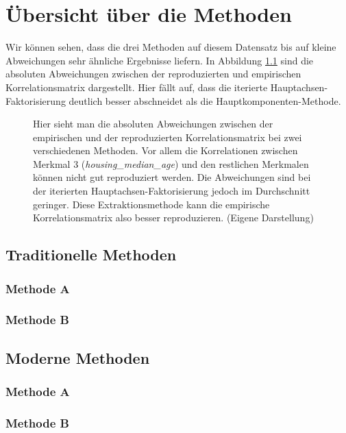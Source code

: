 \chapter{Übersicht über die Methoden}
\label{sec:Übersicht}

Wir können sehen, dass die drei Methoden auf diesem Datensatz bis auf kleine Abweichungen sehr ähnliche Ergebnisse liefern.
In Abbildung \ref{fig:Residualmatrizen} sind die absoluten Abweichungen zwischen der reproduzierten und empirischen Korrelationsmatrix dargestellt. Hier fällt auf, dass die iterierte Hauptachsen-Faktorisierung deutlich besser abschneidet als die Hauptkomponenten-Methode.
\begin{figure}[h]
	
	\caption[(Absolute) Residualmatrizen als Heatmap]{Hier sieht man die absoluten Abweichungen zwischen der empirischen und der reproduzierten Korrelationsmatrix bei zwei verschiedenen Methoden. Vor allem die Korrelationen zwischen Merkmal 3 (\textit{housing\_median\_age}) und
		den restlichen Merkmalen können nicht gut reproduziert werden. Die Abweichungen sind bei der iterierten Hauptachsen-Faktorisierung
		jedoch im Durchschnitt geringer. Diese Extraktionsmethode kann die empirische Korrelationsmatrix also besser reproduzieren.
		(Eigene Darstellung)}
	\label{fig:Residualmatrizen}
\end{figure}


\section{Traditionelle Methoden}

\subsection{Methode A}
\subsection{Methode B}

\section{Moderne Methoden}
\subsection{Methode A}
\subsection{Methode B}

	
